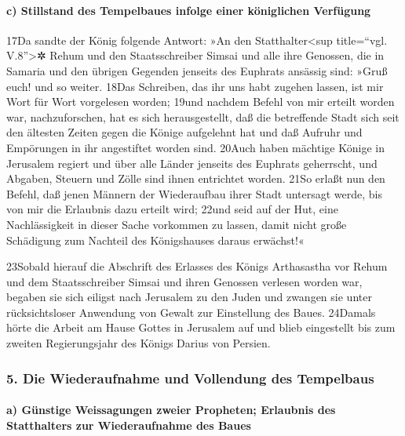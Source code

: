 \hypertarget{c-stillstand-des-tempelbaues-infolge-einer-kuxf6niglichen-verfuxfcgung}{%
\paragraph{c) Stillstand des Tempelbaues infolge einer königlichen
Verfügung}\label{c-stillstand-des-tempelbaues-infolge-einer-kuxf6niglichen-verfuxfcgung}}

17Da sandte der König folgende Antwort: »An den Statthalter\textless sup
title=``vgl. V.8''\textgreater✲ Rehum und den Staatsschreiber Simsai und
alle ihre Genossen, die in Samaria und den übrigen Gegenden jenseits des
Euphrats ansässig sind: »Gruß euch! und so weiter. 18Das Schreiben, das
ihr uns habt zugehen lassen, ist mir Wort für Wort vorgelesen worden;
19und nachdem Befehl von mir erteilt worden war, nachzuforschen, hat es
sich herausgestellt, daß die betreffende Stadt sich seit den ältesten
Zeiten gegen die Könige aufgelehnt hat und daß Aufruhr und Empörungen in
ihr angestiftet worden sind. 20Auch haben mächtige Könige in Jerusalem
regiert und über alle Länder jenseits des Euphrats geherrscht, und
Abgaben, Steuern und Zölle sind ihnen entrichtet worden. 21So erlaßt nun
den Befehl, daß jenen Männern der Wiederaufbau ihrer Stadt untersagt
werde, bis von mir die Erlaubnis dazu erteilt wird; 22und seid auf der
Hut, eine Nachlässigkeit in dieser Sache vorkommen zu lassen, damit
nicht große Schädigung zum Nachteil des Königshauses daraus erwächst!«

23Sobald hierauf die Abschrift des Erlasses des Königs Arthasastha vor
Rehum und dem Staatsschreiber Simsai und ihren Genossen verlesen worden
war, begaben sie sich eiligst nach Jerusalem zu den Juden und zwangen
sie unter rücksichtsloser Anwendung von Gewalt zur Einstellung des
Baues. 24Damals hörte die Arbeit am Hause Gottes in Jerusalem auf und
blieb eingestellt bis zum zweiten Regierungsjahr des Königs Darius von
Persien.

\hypertarget{die-wiederaufnahme-und-vollendung-des-tempelbaus}{%
\subsubsection{5. Die Wiederaufnahme und Vollendung des
Tempelbaus}\label{die-wiederaufnahme-und-vollendung-des-tempelbaus}}

\hypertarget{a-guxfcnstige-weissagungen-zweier-propheten-erlaubnis-des-statthalters-zur-wiederaufnahme-des-baues}{%
\paragraph{a) Günstige Weissagungen zweier Propheten; Erlaubnis des
Statthalters zur Wiederaufnahme des
Baues}\label{a-guxfcnstige-weissagungen-zweier-propheten-erlaubnis-des-statthalters-zur-wiederaufnahme-des-baues}}

